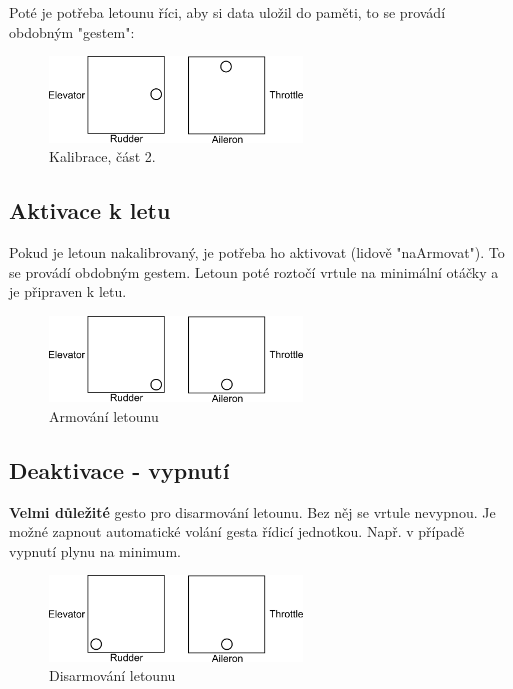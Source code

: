 \documentclass[11pt, a4paper]{article}
\begin{document}
Poté je potřeba letounu říci, aby si data uložil do paměti, to se provádí obdobným "gestem":

\begin{figure}[h]
\begin{center}
\includegraphics[width=0.6\textwidth]{fig/kalibrace2.png}
\caption{Kalibrace, část 2.}
\label{fig:flightctrl}
\end{center}
\end{figure}

\subsection{Aktivace k letu}

Pokud je letoun nakalibrovaný, je potřeba ho aktivovat (lidově "naArmovat"). To se provádí obdobným gestem. Letoun poté roztočí vrtule na minimální otáčky a je připraven k letu.

\begin{figure}[h]
\begin{center}
\includegraphics[width=0.6\textwidth]{fig/arm.png}
\caption{Armování letounu}
\label{fig:flightctrl}
\end{center}
\end{figure}

\subsection{Deaktivace - vypnutí}

\textbf{Velmi důležité} gesto pro disarmování letounu. Bez něj se vrtule nevypnou. Je možné zapnout automatické volání gesta řídicí jednotkou. Např. v případě vypnutí plynu na minimum.

\begin{figure}[h]
\begin{center}
\includegraphics[width=0.6\textwidth]{fig/disarm.png}
\caption{Disarmování letounu}
\label{fig:flightctrl}
\end{center}
\end{figure}
\end{document}

